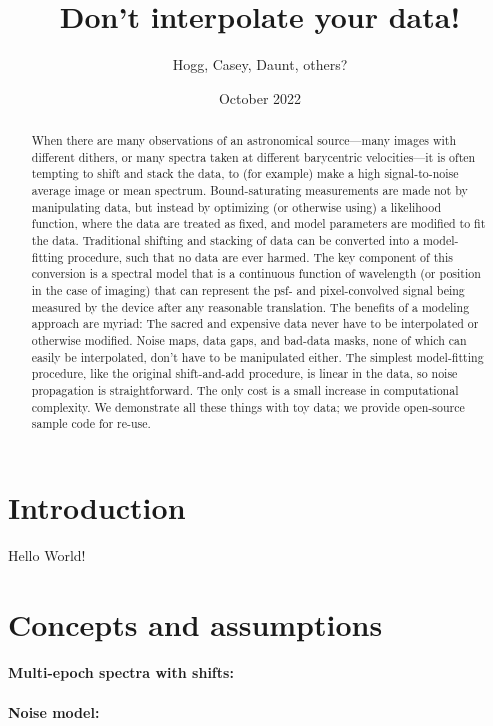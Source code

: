 \documentclass[11pt]{article}
\title{\bfseries%
Don't interpolate your data!}
\author{Hogg, Casey, Daunt, others?}
\date{October 2022}
\begin{document}
\maketitle

\begin{abstract}\noindent
When there are many observations of an astronomical source---many images with different dithers, or many spectra taken at different barycentric velocities---it is often tempting to shift and stack the data, to (for example) make a high signal-to-noise average image or mean spectrum.
Bound-saturating measurements are made not by manipulating data, but instead by optimizing (or otherwise using) 
a likelihood function, where the data are treated as fixed, and model parameters are modified to fit the data.
Traditional shifting and stacking of data can be converted into a model-fitting procedure, such that no data are ever harmed.
The key component of this conversion is a spectral model that is a continuous function of wavelength (or position in the case of imaging) that can represent the psf- and pixel-convolved signal being measured by the device after any reasonable translation.
The benefits of a modeling approach are myriad:
The sacred and expensive data never have to be interpolated or otherwise modified.
Noise maps, data gaps, and bad-data masks, none of which can easily be interpolated, don't have to be manipulated either.
The simplest model-fitting procedure, like the original shift-and-add procedure, is linear in the data, so noise propagation is straightforward.
The only cost is a small increase in computational complexity.
We demonstrate all these things with toy data; we provide open-source sample code for re-use.
\end{abstract}

\section{Introduction}

Hello World!

\section{Concepts and assumptions}

\paragraph{Multi-epoch spectra with shifts:}

\paragraph{Noise model:}
\end{document}
